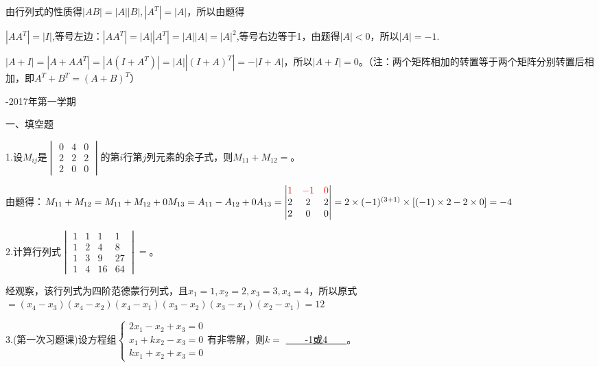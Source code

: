 \documentclass{article}
\begin{document}
\begin{zhengming}
由行列式的性质得$|AB|=|A||B|,|A^{T}|=|A|$，所以由题得

$|AA^{T}|=|I|$,等号左边：$|AA^{T}|=|A||A^{T}|=|A||A|=|A|^{2}$,等号右边等于1，由题得$|A|<0$，所以$|A|=-1$.

$|A+I|=|A+AA^{T}|=|A(I+A^{T})|=|A||(I+A)^{T}|=-|I+A|$，所以$|A+I|=0$。\textcolor[rgb]{1.00,0.00,0.00}{（注：两个矩阵相加的转置等于两个矩阵分别转置后相加，即$A^{T}+B^{T}=(A+B)^{T}$）}
\end{zhengming}
\newpage
\hphantom{~~}\hfill {-2017年第一学期} \hfill\hphantom{~~}

一、填空题

1.设$M_{ij}$是$
\begin{vmatrix}
  0 & 4 & 0 \\
  2 & 2 & 2\\
  2 & 0 & 0
\end{vmatrix}
$的第$i$行第$j$列元素的余子式，则$M_{11}+M_{12}=$\underline{\hphantom{~~~~~~~~~~}}。

\begin{jie}
由题得：$M_ {11}+M_{12}=M_ {11}+M_{12}+0M_{13}=A_{11}-A_{12}+0A_{13}=\begin{vmatrix}
  \textcolor[rgb]{1.00,0.00,0.00}{1} & \textcolor[rgb]{1.00,0.00,0.00}{-1} & \textcolor[rgb]{1.00,0.00,0.00}{0} \\
  2 & 2 & 2\\
  2 & 0 & 0
\end{vmatrix}=2\times(-1)^{(3+1)}\times[(-1)\times 2-2\times0]=-4$
\end{jie}

2.计算行列式$
\begin{vmatrix}
  1 & 1 & 1 & 1 \\
  1 & 2 & 4& 8 \\
  1 & 3 & 9& 27\\
   1 & 4 &16 &64
\end{vmatrix}
=$\underline{\hphantom{~~~~~~~~~~}}。

\begin{jie}
经观察，该行列式为四阶范德蒙行列式，且$x_{1}=1,x_{2}=2,x_{3}=3,x_{4}=4$，所以原式$=(x_{4}-x_{3})(x_{4}-x_{2})(x_{4}-x_{1})(x_{3}-x_{2})(x_{3}-x_{1})(x_{2}-x_{1})=12$
\end{jie}

3.\textcolor[rgb]{0.50,0.00,0.00}{(第一次习题课)}设方程组$
\begin{cases}
 2x_{1}-x_{2}+x_{3}=0\\
 x_{1}+kx_{2}-x_{3}=0\\
 kx_{1}+x_{2}+x_{3}=0
\end{cases}
$有非零解，则$k=$
\underline{~~~~-1或4~~~~}。
\end{document}
